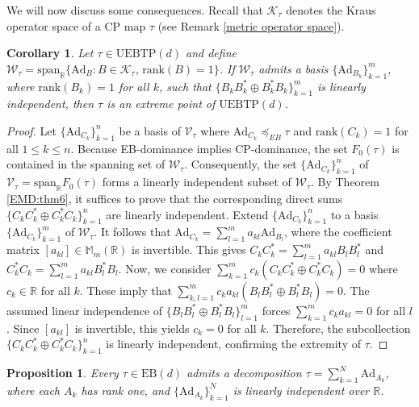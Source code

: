 \documentclass[11pt,reqno]{amsart}
\theoremstyle{definition}
\theoremstyle{plain}
\newtheorem{prop}[defn]{Proposition}
\newtheorem{cor}[defn]{Corollary}
\theoremstyle{remark}
\numberwithin{equation}{section}%
\begin{document}
We will now discuss some consequences. Recall that $\mathscr{K}_\tau$ denotes the Kraus operator space of a CP map $\tau$ (see Remark \ref{metric operator space}).


\begin{cor}\label{extreme}
	Let $\tau \in \mathrm{UEBTP}(d)$ and define $\mathcal{W}_{\tau} = \text{span}_{\mathbb{R}}\{\text{Ad}_B : B \in \mathscr{K}_\tau, \, \text{rank}(B)=1\}$. If $\mathcal{W}_\tau$ admits a basis $\{\text{Ad}_{B_k}\}_{k=1}^m$, where   $\text{rank}(B_k)=1$ for all $k$, such that $\{B_k B_k^* \oplus B_k^* B_k\}_{k=1}^m$ is linearly independent, then $\tau$ is an extreme point of $\mathrm{UEBTP}(d)$.
\end{cor}


\begin{proof}
	    Let $\{\text{Ad}_{C_k}\}_{k=1}^n$ be a basis of $\mathcal{V}_\tau$ where $\text{Ad}_{C_k}\preccurlyeq_{EB}\tau$ and $\text{rank}(C_k)=1$ for all $1\leq k\leq n$. Because EB-dominance implies CP-dominance, the set $F_0(\tau)$ is contained in the spanning set of $\mathcal{W}_\tau$. Consequently, the set $\{\mathrm{Ad}_{C_k}\}_{k=1}^n$ of $\mathcal{V}_\tau = \text{span}_{\mathbb{R}}F_0(\tau)$ forms a linearly independent subset of $\mathcal{W}_\tau$. By Theorem \ref{EMD:thm6}, it suffices to prove that the corresponding direct sums $\{C_k C_k^* \oplus C_k^* C_k\}_{k=1}^n$ are linearly independent. Extend $\{\mathrm{Ad}_{C_k}\}_{k=1}^n$ to a basis $\{\mathrm{Ad}_{C_k}\}_{k=1}^m$ of $\mathcal{W}_\tau$. It follows that $\mathrm{Ad}_{C_k} = \sum_{l=1}^m a_{kl} \mathrm{Ad}_{B_l}$, where the coefficient matrix $[a_{kl}] \in \mathbb{M}_m(\mathbb{R})$ is invertible.  This gives $C_kC_k^*=\sum_{l=1}^m a_{kl}B_lB_l^*$ and $C_k^*C_k=\sum_{l=1}^m a_{kl}B_l^*B_l$. Now, we consider $\sum_{k=1}^mc_k(C_k C_k^* \oplus C_k^* C_k)=0$ where $c_k\in\mathbb{R}$ for all $k$. These imply that $\sum_{k,l=1}^mc_ka_{kl}(B_l B_l^* \oplus B_l^* B_l)=0$. The assumed linear independence of $\{B_l B_l^* \oplus B_l^* B_l\}_{l=1}^m$ forces $\sum_{k=1}^m c_k a_{kl} = 0$ for all $l$. Since $[a_{kl}]$ is invertible, this yields $c_k = 0$ for all $k$. Therefore, the subcollection $\{C_k C_k^* \oplus C_k^* C_k\}_{k=1}^n$ is linearly independent, confirming the extremity of $\tau$.
\end{proof}



\begin{prop}
	Every $\tau \in \mathrm{EB}(d)$ admits a decomposition $\tau = \sum_{k=1}^N \text{Ad}_{A_k}$, where each $A_k$ has rank one, and $\{\text{Ad}_{A_k}\}_{k=1}^N$ is linearly independent over $\mathbb{R}$.
\end{prop} 
\end{document}
